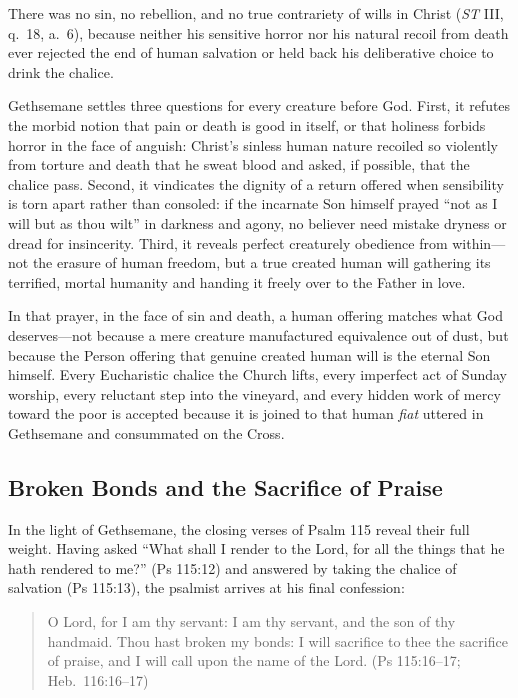 There was no sin, no rebellion, and no true contrariety of wills in Christ (\emph{ST} III, q.\ 18, a.\ 6), because neither his sensitive horror nor his natural recoil from death ever rejected the end of human salvation or held back his deliberative choice to drink the chalice.

Gethsemane settles three questions for every creature before God. First, it refutes the morbid notion that pain or death is good in itself, or that holiness forbids horror in the face of anguish: Christ's sinless human nature recoiled so violently from torture and death that he sweat blood and asked, if possible, that the chalice pass. Second, it vindicates the dignity of a return offered when sensibility is torn apart rather than consoled: if the incarnate Son himself prayed ``not as I will but as thou wilt'' in darkness and agony, no believer need mistake dryness or dread for insincerity. Third, it reveals perfect creaturely obedience from within---not the erasure of human freedom, but a true created human will gathering its terrified, mortal humanity and handing it freely over to the Father in love.

In that prayer, in the face of sin and death, a human offering matches what God deserves---not because a mere creature manufactured equivalence out of dust, but because the Person offering that genuine created human will is the eternal Son himself. Every Eucharistic chalice the Church lifts, every imperfect act of Sunday worship, every reluctant step into the vineyard, and every hidden work of mercy toward the poor is accepted because it is joined to that human \emph{fiat} uttered in Gethsemane and consummated on the Cross.

\subsection{Broken Bonds and the Sacrifice of Praise}

In the light of Gethsemane, the closing verses of Psalm 115 reveal their full weight. Having asked ``What shall I render to the Lord, for all the things that he hath rendered to me?'' (Ps 115:12) and answered by taking the chalice of salvation (Ps 115:13), the psalmist arrives at his final confession:

\begin{quote}
O Lord, for I am thy servant: I am thy servant, and the son of thy handmaid. Thou hast broken my bonds: I will sacrifice to thee the sacrifice of praise, and I will call upon the name of the Lord. (Ps 115:16--17; Heb.\ 116:16--17)
\end{quote}

